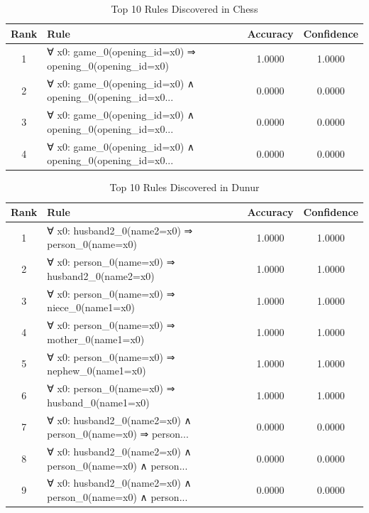 \documentclass[11pt,a4paper]{article}
\begin{document}
\begin{table}[h!]
\centering
\small
\caption{Top 10 Rules Discovered in Chess}
\label{tab:rules_Chess}
\begin{tabular}{|c|p{5cm}|c|c|}
\hline
\textbf{Rank} & \textbf{Rule} & \textbf{Accuracy} & \textbf{Confidence} \\
\hline
1 & ∀ x0: game\_0(opening\_id=x0) ⇒ opening\_0(opening\_id=x0) & 1.0000 & 1.0000 \\
2 & ∀ x0: game\_0(opening\_id=x0) ∧ opening\_0(opening\_id=x0... & 0.0000 & 0.0000 \\
3 & ∀ x0: game\_0(opening\_id=x0) ∧ opening\_0(opening\_id=x0... & 0.0000 & 0.0000 \\
4 & ∀ x0: game\_0(opening\_id=x0) ∧ opening\_0(opening\_id=x0... & 0.0000 & 0.0000 \\
\hline
\end{tabular}
\end{table}

\begin{table}[h!]
\centering
\small
\caption{Top 10 Rules Discovered in Dunur}
\label{tab:rules_Dunur}
\begin{tabular}{|c|p{5cm}|c|c|}
\hline
\textbf{Rank} & \textbf{Rule} & \textbf{Accuracy} & \textbf{Confidence} \\
\hline
1 & ∀ x0: husband2\_0(name2=x0) ⇒ person\_0(name=x0) & 1.0000 & 1.0000 \\
2 & ∀ x0: person\_0(name=x0) ⇒ husband2\_0(name2=x0) & 1.0000 & 1.0000 \\
3 & ∀ x0: person\_0(name=x0) ⇒ niece\_0(name1=x0) & 1.0000 & 1.0000 \\
4 & ∀ x0: person\_0(name=x0) ⇒ mother\_0(name1=x0) & 1.0000 & 1.0000 \\
5 & ∀ x0: person\_0(name=x0) ⇒ nephew\_0(name1=x0) & 1.0000 & 1.0000 \\
6 & ∀ x0: person\_0(name=x0) ⇒ husband\_0(name1=x0) & 1.0000 & 1.0000 \\
7 & ∀ x0: husband2\_0(name2=x0) ∧ person\_0(name=x0) ⇒ person... & 0.0000 & 0.0000 \\
8 & ∀ x0: husband2\_0(name2=x0) ∧ person\_0(name=x0) ∧ person... & 0.0000 & 0.0000 \\
9 & ∀ x0: husband2\_0(name2=x0) ∧ person\_0(name=x0) ∧ person... & 0.0000 & 0.0000 \\
\hline
\end{tabular}
\end{table}
\end{document}
